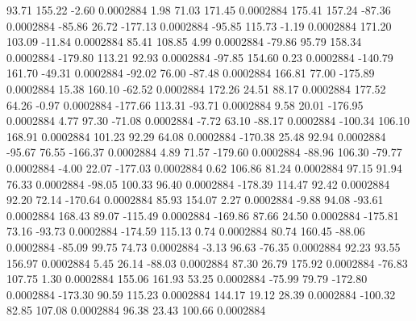        93.71      155.22       -2.60     0.0002884
        1.98       71.03      171.45     0.0002884
      175.41      157.24      -87.36     0.0002884
      -85.86       26.72     -177.13     0.0002884
      -95.85      115.73       -1.19     0.0002884
      171.20      103.09      -11.84     0.0002884
       85.41      108.85        4.99     0.0002884
      -79.86       95.79      158.34     0.0002884
     -179.80      113.21       92.93     0.0002884
      -97.85      154.60        0.23     0.0002884
     -140.79      161.70      -49.31     0.0002884
      -92.02       76.00      -87.48     0.0002884
      166.81       77.00     -175.89     0.0002884
       15.38      160.10      -62.52     0.0002884
      172.26       24.51       88.17     0.0002884
      177.52       64.26       -0.97     0.0002884
     -177.66      113.31      -93.71     0.0002884
        9.58       20.01     -176.95     0.0002884
        4.77       97.30      -71.08     0.0002884
       -7.72       63.10      -88.17     0.0002884
     -100.34      106.10      168.91     0.0002884
      101.23       92.29       64.08     0.0002884
     -170.38       25.48       92.94     0.0002884
      -95.67       76.55     -166.37     0.0002884
        4.89       71.57     -179.60     0.0002884
      -88.96      106.30      -79.77     0.0002884
       -4.00       22.07     -177.03     0.0002884
        0.62      106.86       81.24     0.0002884
       97.15       91.94       76.33     0.0002884
      -98.05      100.33       96.40     0.0002884
     -178.39      114.47       92.42     0.0002884
       92.20       72.14     -170.64     0.0002884
       85.93      154.07        2.27     0.0002884
       -9.88       94.08      -93.61     0.0002884
      168.43       89.07     -115.49     0.0002884
     -169.86       87.66       24.50     0.0002884
     -175.81       73.16      -93.73     0.0002884
     -174.59      115.13        0.74     0.0002884
       80.74      160.45      -88.06     0.0002884
      -85.09       99.75       74.73     0.0002884
       -3.13       96.63      -76.35     0.0002884
       92.23       93.55      156.97     0.0002884
        5.45       26.14      -88.03     0.0002884
       87.30       26.79      175.92     0.0002884
      -76.83      107.75        1.30     0.0002884
      155.06      161.93       53.25     0.0002884
      -75.99       79.79     -172.80     0.0002884
     -173.30       90.59      115.23     0.0002884
      144.17       19.12       28.39     0.0002884
     -100.32       82.85      107.08     0.0002884
       96.38       23.43      100.66     0.0002884

